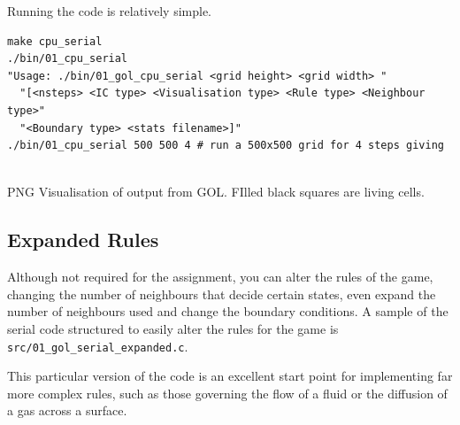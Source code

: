 \par 
Running the code is relatively simple.  
\begin{center}
\begin{minipage}{0.95\textwidth}
\small
\begin{verbatim}
make cpu_serial
./bin/01_cpu_serial 
"Usage: ./bin/01_gol_cpu_serial <grid height> <grid width> "
  "[<nsteps> <IC type> <Visualisation type> <Rule type> <Neighbour type>"
  "<Boundary type> <stats filename>]"
./bin/01_cpu_serial 500 500 4 # run a 500x500 grid for 4 steps giving 
\end{verbatim}
\\	PNG Visualisation of output from GOL. FIlled black squares are living cells.
\end{minipage}
\end{center}

\subsection{Expanded Rules}
Although not required for the assignment, you can alter the rules of the game, changing the number of neighbours that decide certain states, even expand the number of neighbours used and change the boundary conditions. A sample of the serial code structured to easily alter the rules for the game is \texttt{src/01\_gol\_serial\_expanded.c}.

\par 
This particular version of the code is an excellent start point for implementing far more complex rules, such as those governing the flow of a fluid or the diffusion of a gas across a surface.  
